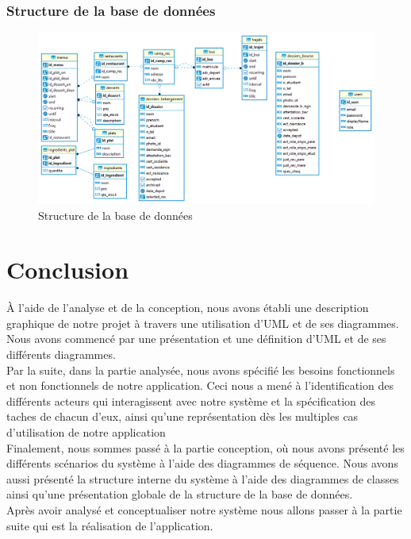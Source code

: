 \subsubsection{Structure de la base de données}
\begin{figure}[H]
    \centering
    \includegraphics[scale=0.38]{ACR/Diagrammes/diag.png}
    \caption{Structure de la base de données}
\end{figure}

\section{Conclusion}
À l'aide de l'analyse et de la conception, nous avons établi une description graphique de notre projet à travers une utilisation d'\acs{UML} et de ses diagrammes.\\

Nous avons commencé par une présentation et une définition d'\acs{UML} et de ses différents diagrammes.\\

Par la suite, dans la partie analysée, nous avons spécifié les besoins fonctionnels et non fonctionnels de notre application. Ceci nous a mené à l'identification des différents acteurs qui interagissent avec notre système et la spécification des taches de chacun d'eux, ainsi qu'une représentation dès les multiples cas d'utilisation de notre application\\

Finalement, nous sommes passé à la partie conception, où nous avons présenté les différents scénarios du système à l'aide des diagrammes de séquence. Nous avons aussi présenté la structure interne du système à l'aide des diagrammes de classes ainsi qu'une présentation globale de la structure de la base de données.\\

Après avoir analysé et conceptualiser notre système nous allons passer à la partie suite qui est la réalisation de l'application.